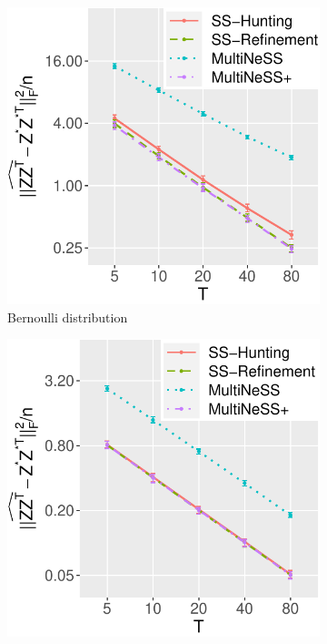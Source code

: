 \documentclass[12pt]{article}
\begin{document}
\begin{figure}%
\centering
\begin{subfigure}{0.29\textwidth}
	\centering
	\includegraphics[width=1\linewidth]{Figures/Simu_BA.pdf}
    \caption{Bernoulli distribution}
\end{subfigure}
\begin{subfigure}{0.29\textwidth}
	\centering
	\includegraphics[width=1\linewidth]{Figures/Simu_GA.pdf}

\end{subfigure}
\end{figure}
\end{document}
